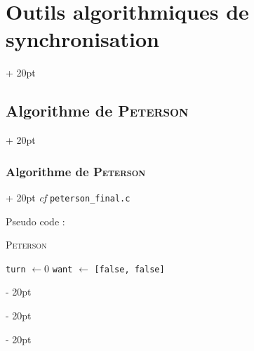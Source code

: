 \documentclass[a4paper, 12pt, twoside]{article}
\newenvironment{indalgo}[2][H]{
    \begin{minipage}{\linewidth-\leftskip-5pt}
        \begin{algorithm}[#1]
            \caption{#2}
}
{
        \end{algorithm}
    \end{minipage}
}
\newcommand{\ind}[1][20pt]{\advance\leftskip + #1}
\newcommand{\deind}[1][20pt]{\advance\leftskip - #1}
\newenvironment{indt}[2][20pt]{#2 \par \ind[#1]}{\par \deind} %
\begin{document}
\begin{indt}{\section{Outils algorithmiques de synchronisation}}
\begin{indt}{\subsection{Algorithme de \textsc{Peterson}}}
\begin{indt}{\subsubsection{Algorithme de \textsc{Peterson}}}
                \textit{cf} \texttt{peterson\_final.c}

                Pseudo code :

% 
% 
%                     
% 
% 
%                         
% 
%                         
% 
%                         
    
                \begin{indalgo}{\textsc{Peterson}}
                    \texttt{turn} $\gets 0$\;
                    \texttt{want} $\gets$ \texttt{[false, false]}\;


                \end{indalgo}


\end{indt}
\end{indt}
\end{indt}
\end{document}
